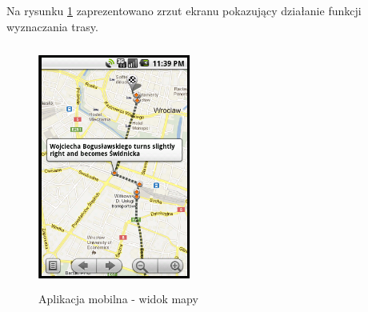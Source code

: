 \documentclass[a4paper]{article}
\begin{document}
Na rysunku \ref{android-mapa} zaprezentowano zrzut ekranu pokazujący działanie funkcji wyznaczania trasy.

\begin{figure}[!h]
\begin{center}
  \includegraphics[width=5cm, height=8cm]{android-mapa.png}
  \caption{Aplikacja mobilna - widok mapy
  \label{android-mapa}}
\end{center}
\end{figure}
\end{document}
